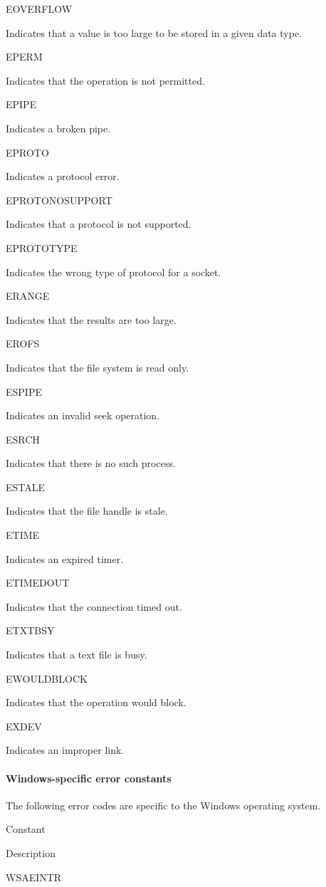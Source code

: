 EOVERFLOW

Indicates that a value is too large to be stored in a given data type.

EPERM

Indicates that the operation is not permitted.

EPIPE

Indicates a broken pipe.

EPROTO

Indicates a protocol error.

EPROTONOSUPPORT

Indicates that a protocol is not supported.

EPROTOTYPE

Indicates the wrong type of protocol for a socket.

ERANGE

Indicates that the results are too large.

EROFS

Indicates that the file system is read only.

ESPIPE

Indicates an invalid seek operation.

ESRCH

Indicates that there is no such process.

ESTALE

Indicates that the file handle is stale.

ETIME

Indicates an expired timer.

ETIMEDOUT

Indicates that the connection timed out.

ETXTBSY

Indicates that a text file is busy.

EWOULDBLOCK

Indicates that the operation would block.

EXDEV

Indicates an improper link.

\paragraph{Windows-specific error
constants}\label{windows-specific-error-constants}

The following error codes are specific to the Windows operating system.

Constant

Description

WSAEINTR

